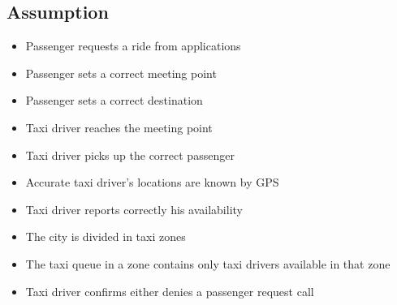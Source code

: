 \subsection{Assumption}
\begin{itemize}
	\item Passenger requests a ride from applications
	\item Passenger sets a correct meeting point
	\item Passenger sets a correct destination
	\item Taxi driver reaches the meeting point
	\item Taxi driver picks up the correct passenger
	\item Accurate taxi driver's locations are known by GPS
	\item Taxi driver reports correctly his availability
	\item The city is divided in taxi zones
	\item The taxi queue in a zone contains only taxi drivers available in that zone
	\item Taxi driver confirms either denies a passenger request call
\end{itemize}